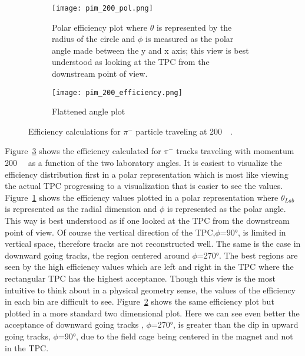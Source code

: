 \begin{figure}[!htb]
    \centering
    \begin{subfigure}[t]{0.49\textwidth}
        \centering
        \texttt{[image: pim\_200\_pol.png]}
        \caption{Polar efficiency plot where $\theta$ is represented by the radius of the circle and $\phi$ is measured as the polar angle made between the y and x axis; this view is  best understood as looking at the TPC from the downstream point of view.} \label{fig:pim_pol_eff_ex}
    \end{subfigure}
    \hfill
    \begin{subfigure}[t]{.49\textwidth}
        \centering
        \texttt{[image: pim\_200\_efficiency.png]} 
        \caption{Flattened angle plot} \label{fig:pim_flat_eff_ex}
    \end{subfigure}
  
\caption{Efficiency calculations for $\pi^-$ particle traveling at \SI{200}{\mega\eVperc}.}
\label{fig:pim_eff_ex}
\end{figure}
 
 
 
Figure~\ref{fig:pim_eff_ex} shows the efficiency calculated for $\pi^-$ tracks traveling with momentum \SI{200}{\mega\eVperc} as a function of the two laboratory angles. It is easiest to visualize the efficiency distribution first in a polar representation which is most like viewing the actual TPC progressing to a visualization that is easier to see the values. Figure~\ref{fig:pim_pol_eff_ex} shows the efficiency values plotted in a polar representation where $\theta_{Lab}$ is represented as the radial dimension and $\phi$ is represented as the polar angle. This way is best understood as if one looked at the TPC from the downstream point of view. Of course the vertical direction of the TPC,$\phi$=\ang{90}, is limited in vertical space, therefore tracks are not reconstructed well. The same is the case in downward going tracks, the region centered around $\phi$=\ang{270}. The best regions are seen by the high efficiency values which are left and right in the TPC where the rectangular TPC has the highest acceptance. Though this view is the most intuitive to think about in a physical geometry sense, the values of the efficiency in each bin are difficult to see. Figure~\ref{fig:pim_flat_eff_ex} shows the same efficiency plot but plotted in a more standard two dimensional plot. Here we can see even better the acceptance of downward going tracks , $\phi$=\ang{270}, is greater than the dip in upward going tracks, $\phi$=\ang{90}, due to the field cage being centered in the magnet and not in the TPC. 

